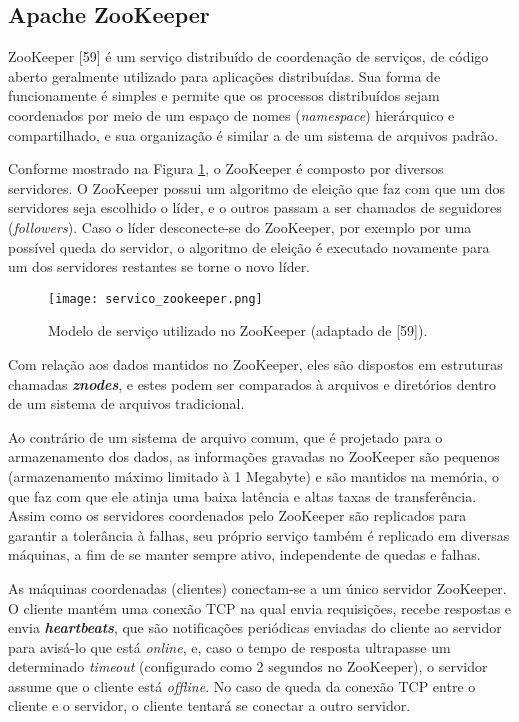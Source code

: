 \subsection{Apache ZooKeeper} \label{cap4sec1subsec2}

ZooKeeper [59] é um serviço distribuído de coordenação de serviços, de código aberto geralmente utilizado para aplicações distribuídas. Sua forma de funcionamente é simples e permite que os processos distribuídos sejam coordenados por meio de um espaço de nomes (\textit{namespace}) hierárquico e compartilhado, e sua organização é similar a de um sistema de arquivos padrão. 

Conforme mostrado na Figura \ref{fig:servico_zookeeper}, o ZooKeeper é composto por diversos servidores. O ZooKeeper possui um algoritmo de eleição que faz com que um dos servidores seja escolhido o líder, e o outros passam a ser chamados de seguidores (\textit{followers}). Caso o líder desconecte-se do ZooKeeper, por exemplo por uma possível queda do servidor, o algoritmo de eleição é executado novamente para um dos servidores restantes se torne o novo líder. 

\begin{figure}[H]
	\centering
	\texttt{[image: servico\_zookeeper.png]}
	\caption{Modelo de serviço utilizado no ZooKeeper (adaptado de [59]).}
	\label{fig:servico_zookeeper}
\end{figure}

Com relação aos dados mantidos no ZooKeeper, eles são dispostos em estruturas chamadas \textbf{\textit{znodes}}, e estes podem ser comparados à arquivos e diretórios dentro de um sistema de arquivos tradicional. 

Ao contrário de um sistema de arquivo comum, que é projetado para o armazenamento dos dados, as informações gravadas no ZooKeeper são pequenos (armazenamento máximo limitado à 1 Megabyte) e são mantidos na memória, o que faz com que ele atinja uma baixa latência e altas taxas de transferência. Assim como os servidores coordenados pelo ZooKeeper são replicados para garantir a tolerância à falhas, seu próprio serviço também é replicado em diversas máquinas, a fim de se manter sempre ativo, independente de quedas e falhas. 

As máquinas coordenadas (clientes) conectam-se a um único servidor ZooKeeper. O cliente mantém uma conexão TCP na qual envia requisições, recebe respostas e envia \textbf{\textit{heartbeats}}, que são notificações periódicas enviadas do cliente ao servidor para avisá-lo que está \textit{online}, e, caso o tempo de resposta ultrapasse um determinado \textit{timeout} (configurado como 2 segundos no ZooKeeper), o servidor assume que o cliente está \textit{offline}. No caso de queda da conexão TCP entre o cliente e o servidor, o cliente tentará se conectar a outro servidor. 

